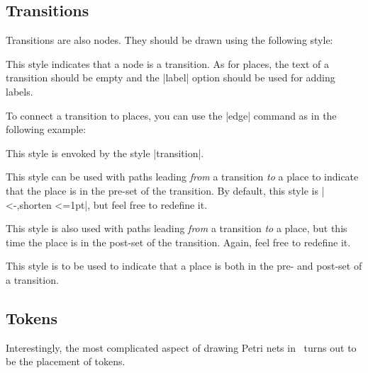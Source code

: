 \subsection{Transitions}

Transitions are also nodes. They should be drawn using the following
style: 

\begin{itemize}
  This style indicates that a node is a transition. As for places, the
  text of a transition should be empty and the |label| option should
  be used for adding labels.

  To connect a transition to places, you can use the |edge| command as
  in the following example:
  
\begin{codeexample}[]
\end{codeexample}
  
  This style is envoked by the style |transition|.

  This style can be used with paths leading \emph{from} a transition
  \emph{to} a place to indicate that the place is in the pre-set of
  the transition. By default, this style is |<-,shorten <=1pt|, but
  feel free to redefine it.

  This style is also used with paths leading \emph{from} a transition
  \emph{to} a place, but this time the place is in the post-set of
  the transition. Again, feel free to redefine it.

  This style is to be used to indicate that a place is both in the
  pre- and post-set of a transition.
\end{itemize}


\subsection{Tokens}
\label{section-tokens}

Interestingly, the most complicated aspect of drawing Petri nets in
\tikzname\ turns out to be the placement of tokens.

